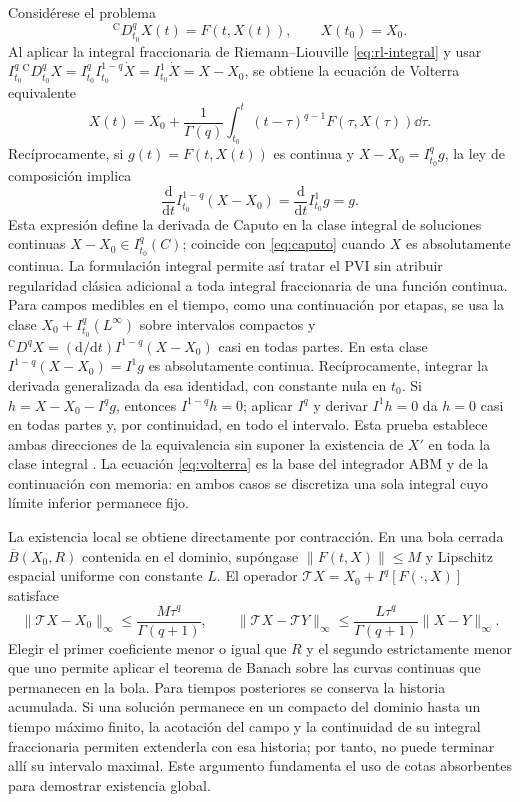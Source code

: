 Considérese el problema
\begin{equation}
{}^{\mathrm C}D_{t_0}^{q}X(t)=F(t,X(t)),
\qquad X(t_0)=X_0.
\label{eq:pvi_caputo}
\end{equation}
Al aplicar la integral fraccionaria de Riemann--Liouville
\cref{eq:rl-integral}
y usar
\(I_{t_0}^{q}{}^{\mathrm C}D_{t_0}^{q}X
=I_{t_0}^{q}I_{t_0}^{1-q}\dot X
=I_{t_0}^{1}\dot X=X-X_0\), se obtiene la
ecuación de Volterra equivalente
\begin{equation}
X(t)=X_0+\frac{1}{\Gamma(q)}
\int_{t_0}^{t}(t-\tau)^{q-1}F(\tau,X(\tau))\dd\tau.
\label{eq:volterra}
\end{equation}
Recíprocamente, si \(g(t)=F(t,X(t))\) es continua y
\(X-X_0=I_{t_0}^qg\), la ley de composición implica
\[
 \frac{\mathrm d}{\mathrm dt}I_{t_0}^{1-q}(X-X_0)
 =\frac{\mathrm d}{\mathrm dt}I_{t_0}^{1}g=g.
\]
Esta expresión define la derivada de Caputo en la clase integral de
soluciones continuas \(X-X_0\in I_{t_0}^q(C)\); coincide con
\eqref{eq:caputo} cuando \(X\) es absolutamente continua.
La formulación integral permite así tratar el PVI sin atribuir regularidad
clásica adicional a toda integral fraccionaria de una función continua.
Para campos medibles en el tiempo, como una continuación por etapas,
se usa la clase $X_0+I_{t_0}^q(L^\infty)$ sobre intervalos compactos y
${}^{\mathrm C}D^qX=(\mathrm d/\mathrm dt)I^{1-q}(X-X_0)$ casi en todas
partes. En esta clase $I^{1-q}(X-X_0)=I^1g$ es absolutamente continua.
Recíprocamente, integrar la derivada generalizada da esa identidad, con
constante nula en $t_0$. Si $h=X-X_0-I^qg$, entonces $I^{1-q}h=0$;
aplicar $I^q$ y derivar $I^1h=0$ da $h=0$ casi en todas partes y, por
continuidad, en todo el intervalo. Esta prueba establece ambas direcciones
de la equivalencia sin suponer la existencia de $X'$ en toda la clase integral
\cite{Gomoyunov2018Convex}.
La ecuación \eqref{eq:volterra} es la base del integrador ABM y de la continuación con memoria:
en ambos casos se discretiza una sola integral cuyo límite inferior permanece
fijo.

La existencia local se obtiene directamente por contracción. En una bola
cerrada $\overline B(X_0,R)$ contenida en el dominio, supóngase
$\|F(t,X)\|\le M$ y Lipschitz espacial uniforme con constante $L$.
El operador $\mathcal TX=X_0+I^q[F(\cdot,X)]$ satisface
\[
 \|\mathcal TX-X_0\|_\infty\le\frac{M\tau^q}{\Gamma(q+1)},
 \qquad
 \|\mathcal TX-\mathcal TY\|_\infty
 \le\frac{L\tau^q}{\Gamma(q+1)}\|X-Y\|_\infty.
\]
Elegir el primer coeficiente menor o igual que $R$ y el segundo estrictamente
menor que uno permite aplicar el teorema de Banach sobre las curvas continuas
que permanecen en la bola. Para tiempos posteriores se conserva la historia
acumulada. Si una solución permanece en un compacto del dominio hasta un
tiempo máximo finito, la acotación del campo y la continuidad de su integral
fraccionaria permiten extenderla con esa historia; por tanto, no puede
terminar allí su intervalo maximal. Este argumento fundamenta el uso de
cotas absorbentes para demostrar existencia global.

